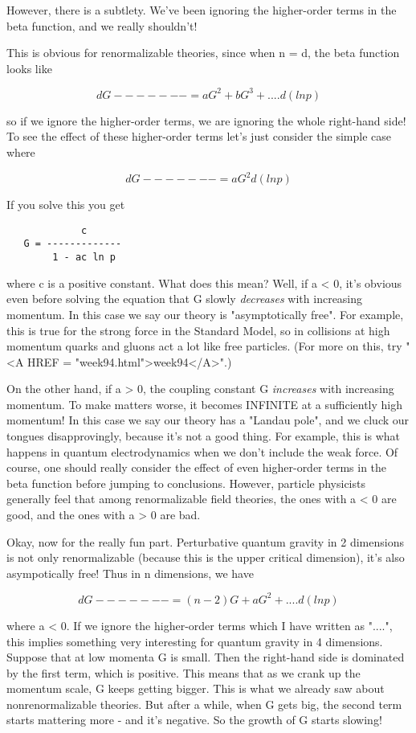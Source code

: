 However, there is a subtlety.  We've been ignoring the higher-order
terms in the beta function, and we really shouldn't!

This is obvious for renormalizable theories, since when n = d, the 
beta function looks like

$$
   dG 
 -------  = aG^{2} + bG^{3} + ....
 d(ln p)
$$
    
so if we ignore the higher-order terms, we are ignoring the whole 
right-hand side!  To see the effect of these higher-order terms let's 
just consider the simple case where

$$
   dG 
 -------  = aG^{2}
 d(ln p)
$$
    
If you solve this you get

\begin{verbatim}
             c 
   G = -------------
        1 - ac ln p 
\end{verbatim}
    
where c is a positive constant.   What does this mean?  Well, if a < 0, 
it's obvious even before solving the equation that G slowly \emph{decreases} 
with increasing momentum.  In this case we say our theory is 
"asymptotically free".   For example, this is true for the strong 
force in the Standard Model, so in collisions at high momentum quarks 
and gluons act a lot like free particles.  (For more on this, try "<A HREF = "week94.html">week94</A>".)

On the other hand, if a > 0, the coupling constant G
\emph{increases} with increasing momentum.  To make matters worse, it
becomes INFINITE at a sufficiently high momentum!  In this case we say
our theory has a "Landau pole", and we cluck our tongues
disapprovingly, because it's not a good thing.  For example, this is
what happens in quantum electrodynamics when we don't include the weak
force.  Of course, one should really consider the effect of even
higher-order terms in the beta function before jumping to conclusions.
However, particle physicists generally feel that among renormalizable
field theories, the ones with a < 0 are good, and the ones with a
> 0 are bad.

Okay, now for the really fun part.  Perturbative quantum gravity
in 2 dimensions is not only renormalizable (because this is the 
upper critical dimension), it's also asympotically free!  Thus
in n dimensions, we have

$$
   dG 
 -------  = (n - 2)G + aG^{2} + ....
 d(ln p)
$$
    
where a < 0.  If we ignore the higher-order terms which I have
written as "....", this implies something very interesting for
quantum gravity in 4 dimensions.  Suppose that at low momenta
G is small.  Then the right-hand side is dominated by the first
term, which is positive.  This means that as we crank up the 
momentum scale, G keeps getting bigger.  This is what we already 
saw about nonrenormalizable theories.  But after a while, when G 
gets big, the second term starts mattering more - and it's negative.
So the growth of G starts slowing!

